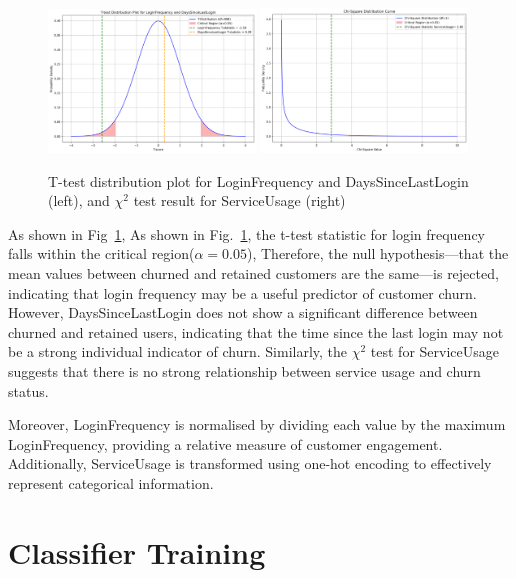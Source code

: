 \documentclass[journal=gmj]{CUP-JNL-DTM}%
\theoremstyle{definition}
\numberwithin{equation}{section}
\begin{document}
\begin{figure}[h]
    \centering
    \includegraphics[width=0.49\textwidth]{Plots/T_test_Distribution.png}
    \includegraphics[width=0.49\textwidth]{Plots/Chi-Square_ServiceUsage.png}
    \caption{T-test distribution plot for LoginFrequency and DaysSinceLastLogin (left), and $\chi^2$ test result for ServiceUsage (right)}
    \label{fig:hypothesistesting}
\end{figure}

 As shown in Fig~\ref{fig:hypothesistesting}, As shown in Fig.~\ref{fig:hypothesistesting}, the t-test statistic for login frequency falls within the critical region($\alpha =0.05$), Therefore, the null hypothesis—that the mean values between churned and retained customers are the same—is rejected, indicating that login frequency may be a useful predictor of customer churn. However, DaysSinceLastLogin does not show a significant difference between churned and retained users, indicating that the time since the last login may not be a strong individual indicator of churn. Similarly, the $\chi^2$ test for ServiceUsage suggests that there is no strong relationship between service usage and churn status.

Moreover, LoginFrequency is normalised by dividing each value by the maximum LoginFrequency, providing a relative measure of customer engagement. Additionally, ServiceUsage is transformed using one-hot encoding to effectively represent categorical information.

\section{Classifier Training}
\end{document}
